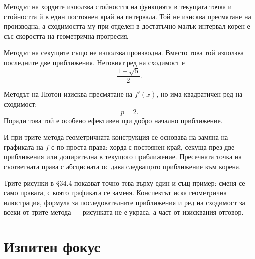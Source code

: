 Методът на хордите използва стойността на функцията в текущата точка и стойността й в един постоянен край на интервала. Той не изисква пресмятане на производна, а сходимостта му при отделен в достатъчно малък интервал корен е със скоростта на геометрична прогресия.

Методът на секущите също не използва производна. Вместо това той използва последните две приближения. Неговият ред на сходимост е
\[
\frac{1+\sqrt5}{2}.
\]

Методът на Нютон изисква пресмятане на $f'(x)$, но има квадратичен ред на сходимост:
\[
p=2.
\]
Поради това той е особено ефективен при добро начално приближение.

И при трите метода геометричната конструкция се основава на замяна на графиката на $f$ с по-проста права: хорда с постоянен край, секуща през две приближения или допирателна в текущото приближение. Пресечната точка на съответната права с абсцисната ос дава следващото приближение към корена.

Трите рисунки в \S34.4 показват точно това върху един и същ пример: сменя се само
правата, с която графиката се заменя. Конспектът иска геометрична илюстрация,
формула за последователните приближения и ред на сходимост за всеки от трите
метода --- рисунката не е украса, а част от изисквания отговор.

\section{Изпитен фокус}\label{s:34.6}

